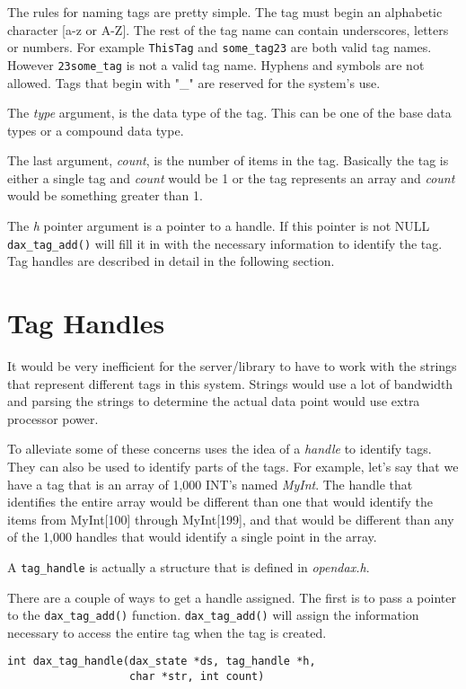 The rules for naming tags are pretty simple.  The tag must begin an alphabetic character [a-z or A-Z].  The rest of the tag name can contain underscores, letters or numbers.  For example \verb|ThisTag| and \verb|some_tag23| are both valid tag names.  However \verb|23some_tag| is not a valid tag name.  Hyphens and symbols are not allowed.  Tags that begin with "\_" are reserved for the system's use.

The \emph{type} argument, is the data type of the tag.  This can be one of the base data types or a compound data type.

The  last argument, \emph{count}, is the number of items in the tag.  Basically the tag is either a single tag and \emph{count} would be 1 or the tag represents an array and \emph{count} would be something greater than 1.

The \emph{h} pointer argument is a pointer to a handle.  If this pointer is not NULL \verb|dax_tag_add()| will fill it in with the necessary information to identify the tag.  Tag handles are described in detail in the following section.

\section{Tag Handles}
It would be very inefficient for the server/library to have to work with the strings that represent different tags in this system.  Strings would use a lot of bandwidth and parsing the strings to determine the actual data point would use extra processor power.

To alleviate some of these concerns \opendax uses the idea of a \emph{handle} to identify tags.  They can also be used to identify parts of the tags.  For example, let's say that we have a tag that is an array of 1,000 INT's named \emph{MyInt}.  The handle that identifies the entire array would be different than one that would identify the items from MyInt[100] through MyInt[199], and that would be different than any of the 1,000 handles that would identify a single point in the array.

A \verb|tag_handle| is actually a structure that is defined in \emph{opendax.h}.

There are a couple of ways to get a handle assigned.  The first is to pass a pointer to the \verb|dax_tag_add()| function.  \verb|dax_tag_add()| will assign the information necessary to access the entire tag when the tag is created.

\begin{verbatim}
int dax_tag_handle(dax_state *ds, tag_handle *h,
                   char *str, int count)
\end{verbatim}

